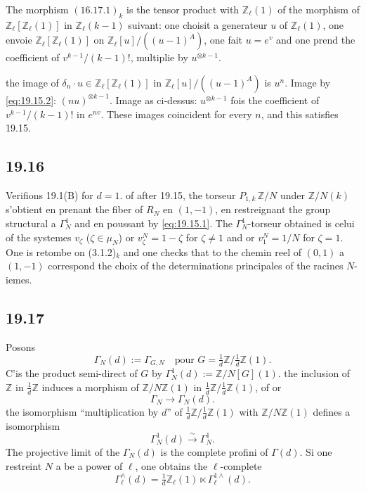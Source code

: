 \documentclass[12pt,a4paper]{article}
\theoremstyle{plain}
\theoremstyle{definition}
\theoremstyle{remark}
\newcommand{\ZZ}{\mathbb{Z}}
\begin{document}
The morphism $(16.17.1)_k$ is the tensor product with
$\ZZ_\ell(1)$ of the morphism of $\ZZ_\ell[\ZZ_\ell(1)]$ in
$\ZZ_\ell(k-1)$ suivant: one choisit a generateur $u$ of
$\ZZ_\ell(1)$, one envoie $\ZZ_\ell[\ZZ_\ell(1)]$ on
$\ZZ_\ell[u]/((u-1)^A)$, one fait $u = e^v$ and one prend the coefficient
of $v^{k-1}/(k-1)!$, multiplie by $u^{\otimes k-1}$.

the image of $\delta_n \cdot u \in \ZZ_\ell[\ZZ_\ell(1)]$ in
$\ZZ_\ell[u]/((u-1)^A)$ is $u^n$. Image by
\eqref{eq:19.15.2}: $(nu)^{\otimes k-1}$. Image as ci-dessus:
$u^{\otimes k-1}$ fois the coefficient of $v^{k-1}/(k-1)!$ in
$e^{nv}$. These images coincident for every $n$, and this satisfies
19.15.

\subsection{19.16}

Verifions 19.1(B) for $d=1$. of after 19.15, the torseur
$P_{1,k}\, \ZZ/N$ under $\ZZ/N(k)$ s'obtient en prenant the fiber of
$R_N$ en $(1,-1)$, en restreignant the group structural a
$\Gamma_N^1$ and en poussant by \eqref{eq:19.15.1}. The
$\Gamma_N^1$-torseur obtained is celui of the systemes $v_\zeta$
($\zeta \in \mu_N$) or $v_\zeta^N = 1-\zeta$ for $\zeta \neq 1$ and
or $v_1^N = 1/N$ for $\zeta = 1$. One is retombe on (3.1.2)$_k$ and
one checks that to the chemin reel of $(0,1)$ a $(1,-1)$ correspond the choix
of the determinations principales of the racines $N$-iemes.

\subsection{19.17}

Posons
\[
\Gamma_N(d) := \Gamma_{G,N} \quad \text{pour } G =
\tfrac{1}{d}\ZZ/\tfrac{1}{d}\ZZ(1).
\]
C'is the product semi-direct of $G$ by $\Gamma_N^1(d) :=
\ZZ/N[G](1)$. the inclusion of $\ZZ$ in $\frac{1}{d}\ZZ$ induces a
morphism of $\ZZ/N\ZZ(1)$ in
$\frac{1}{d}\ZZ/\frac{1}{d}\ZZ(1)$, of or
\begin{equation}\label{eq:19.17.1}
\Gamma_N \to \Gamma_N(d).
\end{equation}
the isomorphism ``multiplication by $d$'' of
$\frac{1}{d}\ZZ/\frac{1}{d}\ZZ(1)$ with $\ZZ/N\ZZ(1)$ defines a
isomorphism
\begin{equation}\label{eq:19.17.2}
\Gamma_N^1(d) \xrightarrow{\sim} \Gamma_N^1.
\end{equation}
The projective limit of the $\Gamma_N(d)$ is the complete profini of
$\Gamma(d)$. Si one restreint $N$ a be a power of $\ell$, one obtains the $\ell$-complete
\[
\Gamma_\ell^\wedge(d) = \tfrac{1}{d}\ZZ_\ell(1) \ltimes
\Gamma_\ell^{1\wedge}(d).
\]
\end{document}
